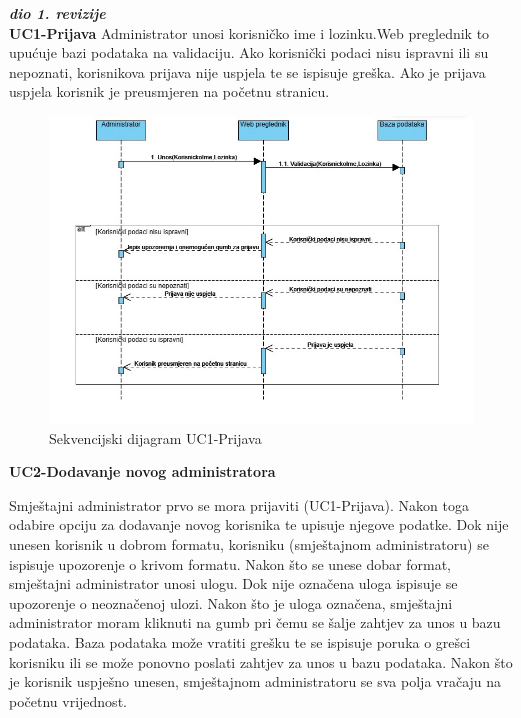 				\textbf{\textit{dio 1. revizije}}\\
				\textbf{UC1-Prijava}
				{Administrator unosi korisničko ime i lozinku.Web preglednik to upućuje bazi podataka na validaciju. Ako korisnički podaci nisu ispravni ili su nepoznati, korisnikova prijava nije uspjela te se ispisuje greška. Ako je prijava uspjela korisnik je preusmjeren na početnu stranicu.}
				
				\begin{figure}[H]
					\includegraphics[width=\linewidth]{slike/DentAll_Sekvencijski-UC1-Prijava.jpeg} 
					\centering
					\caption{Sekvencijski dijagram UC1-Prijava}
					\label{fig:Sekvencijski dijagram UC1}
				\end{figure}
				
				\newpage
				
					\textbf{UC2-Dodavanje novog administratora}
					
					{Smještajni administrator prvo se mora prijaviti (UC1-Prijava). Nakon toga odabire opciju za dodavanje novog korisnika te upisuje njegove podatke. Dok nije unesen korisnik u dobrom formatu, korisniku (smještajnom administratoru) se ispisuje upozorenje o krivom formatu. Nakon što se unese dobar format, smještajni administrator unosi ulogu. Dok nije označena uloga ispisuje se upozorenje o neoznačenoj ulozi. Nakon što je uloga označena, smještajni administrator moram kliknuti na gumb pri čemu se šalje zahtjev za unos u bazu podataka. Baza  podataka može vratiti grešku te se ispisuje poruka o grešci korisniku ili se može ponovno poslati zahtjev za unos u bazu podataka. Nakon što je korisnik uspješno unesen, smještajnom administratoru se sva polja vračaju na početnu vrijednost.}
				
